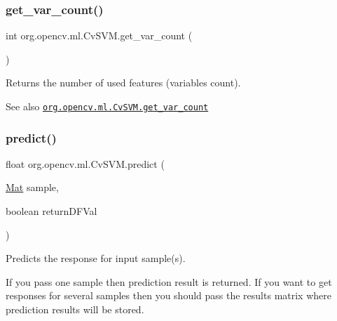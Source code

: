 \mbox{\label{classorg_1_1opencv_1_1ml_1_1_cv_s_v_m_ae746960801621738e3148cb67c0835f3}} 
\subsubsection{\texorpdfstring{get\+\_\+var\+\_\+count()}{get\_var\_count()}}
{\footnotesize\ttfamily int org.\+opencv.\+ml.\+Cv\+S\+V\+M.\+get\+\_\+var\+\_\+count (\begin{DoxyParamCaption}{ }\end{DoxyParamCaption})}

Returns the number of used features (variables count).

\begin{DoxySeeAlso}{See also}
\href{http://docs.opencv.org/modules/ml/doc/support_vector_machines.html#cvsvm-get-var-count}{\tt org.\+opencv.\+ml.\+Cv\+S\+V\+M.\+get\+\_\+var\+\_\+count} 
\end{DoxySeeAlso}
\mbox{\label{classorg_1_1opencv_1_1ml_1_1_cv_s_v_m_ae6f65370c9fee5f2959d9737d40aadd9}} 
\subsubsection{\texorpdfstring{predict()}{predict()}\hspace{0.1cm}{\footnotesize\ttfamily [1/2]}}
{\footnotesize\ttfamily float org.\+opencv.\+ml.\+Cv\+S\+V\+M.\+predict (\begin{DoxyParamCaption}\item[{\mbox{\hyperlink{classorg_1_1opencv_1_1core_1_1_mat}{Mat}}}]{sample,  }\item[{boolean}]{return\+D\+F\+Val }\end{DoxyParamCaption})}

Predicts the response for input sample(s).

If you pass one sample then prediction result is returned. If you want to get responses for several samples then you should pass the {\ttfamily results} matrix where prediction results will be stored.

